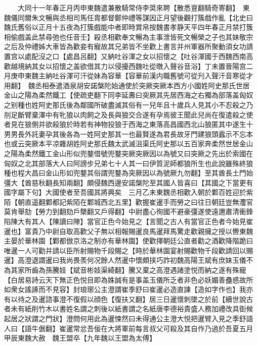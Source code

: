 　　大同十一年春正月丙申東魏遣兼散騎常侍李奨來聘【散悉亶翻騎奇寄翻】　東魏儀同爾朱文暢與丞相司馬任胄都督鄭仲禮等謀因正月望後觀打簇戲作亂【北史曰魏氏舊俗以正月十五夜為打簇戲能中者即時賞帛按魏書孝静天平四年春正月禁打簇相偷戲盖此禁尋弛也任音壬】殺丞相歡奉文暢為主事泄皆死文暢榮之子也其妹敬宗之后及仲禮姊大車皆為歡妾有寵故其兄弟皆不坐歡上書言并州軍器所聚動須女功請置宫以處配沒之口【處昌呂翻】又納吐谷渾之女以招懷之【吐谷渾國于西魏西南高歡越境納其女以招懷之盖欲借其力以侵擾西魏吐從暾入聲谷音浴】丁未置晉陽宫二月庚申東魏主納吐谷渾可汗從妹為容華【容華前漢内職舊號可從刋入聲汗音寒從才用翻】　魏丞相泰遣酒泉胡安諾槃陀始通使於突厥突厥本西方小國姓阿史那氏世居金山之陽為柔然鐵工【使疏吏翻下同李延夀曰突厥其先居西海之右獨為部落盖匈奴之别種也姓阿史那氏後為鄰國所破盡滅其俗有一兒年且十歲兵人見其小不忍殺之乃刖足斷臂棄澤中有牝狼以肉飼之及長與狼交合遂有孕焉彼王聞此兒尚在復遣殺之使者見在狼側并欲殺狼於時若有神物投狼于西海之東落高昌國西北山狼匿其中遂生十男男長外託妻孕其後各為一姓阿史那其一也最賢遂為君長故牙門建狼頭蠧示不忘本也或云突厥本平凉雜胡姓阿史那氏魏太武滅沮渠氏阿史那以五百家奔柔然世居金山之陽為柔然鐵工金山形似兜鍪借號兜鍪突厥突厥因以為號又曰突厥之先出於索國在匈奴之北其部落大人曰阿謗步兄弟七十人其一曰伊質泥師都狼所生也此說雖殊終狼種也程大昌曰金山形如兜鍪其俗謂兜鍪為突厥因以為號厥九勿翻】至其酋長土門始彊大【酋慈秋翻長知兩翻】頗侵魏西邊安諾槃陀至其國人皆喜曰【其國之下當更有國字屬下句】大國使者至吾國其將興矣　三月乙未東魏丞相歡入朝於鄴百姓迎於紫陌【朝直遥翻鄴都記紫陌在鄴城西北五里】歡握崔暹手而勞之曰往日朝廷豈無灋官莫肯舉劾【勞力到翻劾戶槩翻又戶得翻】中尉盡心徇國不避豪彊遂使遠邇肅清衝鋒陷陳大有其人【陳讀曰陣】當官正色今始見之【言聞之古人有當官正色者今始見崔暹也】富貴乃中尉自取高歡父子無以相報賜暹良馬暹拜馬驚走歡親擁之授以轡東魏主晏於華林園【鄴都倣京洛之制亦有華林園】使歡擇朝廷公直者勸之酒歡降階跪曰唯暹一人可勸并請以臣所射賜物千段賜之【時於華林園宴射賜歡物千段歡請回以賜暹】高澄退謂暹曰我尚畏羨何况餘人然暹中懷頗挟巧詐初魏高陽王斌有庶妹玉儀不為其家所齒為孫騰妓【斌音彬妓渠綺翻】騰又棄之高澄遇諸塗悦而納之遂有殊寵【白居易詩云天下無正色悦目即為姝誠有是事盖玉儀所乏者非色必妖媚善蠱惑故所如衆女謠諑而不見容】封琅琊公主澄謂崔季舒曰崔暹必造直諫【造如字作也】我亦有以待之及暹諮事澄不復假以顔色【復扶又翻】居三日暹懷刺墜之於前【續世說古者未有紙削竹木以書姓名謂之刺後以紙書謂之名紙唐李德裕貴盛人務加禮改具衘候起居之狀謂之門狀】澄問何用此為暹悚然曰未得通公主澄大悦把暹臂入見之季舒語人曰【語牛倨翻】崔暹常忿吾佞在大將軍前每言叔父可殺及其自作乃過於吾夏五月甲辰東魏大赦　魏王盟卒【九年魏以王盟為太傅】


